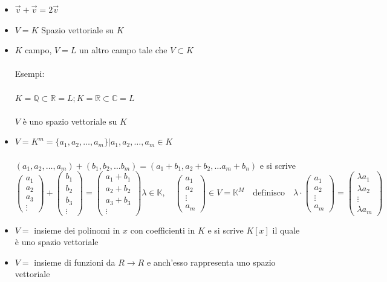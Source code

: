 \documentclass{report}
\begin{document}
\begin{itemize}
    \item{$\Vec{v} + \Vec{v} = 2\Vec{v}$}
    \item{$V = K$ Spazio vettoriale su $K$}
    \item{$K$ campo, $V = L$ un altro campo tale che $V \subset K$ \\ \\
    Esempi: \\ \\
    $K = \mathbb{Q} \subset \mathbb{R} = L ; K = \mathbb{R} \subset \mathbb{C} = L$
    \\ \\
    $V$ è uno spazio vettoriale su $K$}
    \item{$V = K^m = \{a_1, a_2, \dots, a_m\} | a_1, a_2, \dots, a_m \in K$ \\ \\
    $(a_1, a_2, \dots, a_m) + (b_1, b_2, \dots b_m) = (a_1 + b_1, a_2 + b_2, \dots a_m + b_n)$ e si scrive $\begin{pmatrix}
a_1 \\
a_2 \\
a_3 \\
\vdots
\end{pmatrix}
+
\begin{pmatrix}
b_1 \\
b_2 \\
b_3 \\
\vdots
\end{pmatrix}
=
\begin{pmatrix}
a_1 + b_1 \\
a_2 + b_2 \\
a_3 + b_3 \\
\vdots
\end{pmatrix}

\lambda \in \mathbb{K}, \quad
\begin{pmatrix}
a_1 \\
a_2 \\
\vdots \\
a_m
\end{pmatrix}
\in V = \mathbb{K}^M \quad \text{definisco} \quad \lambda \cdot
\begin{pmatrix}
a_1 \\
a_2 \\
\vdots \\
a_m
\end{pmatrix}
=
\begin{pmatrix}
\lambda a_1 \\
\lambda a_2 \\
\vdots \\
\lambda a_m
\end{pmatrix}
$}
\item{
$V = $ insieme dei polinomi in $x$ con coefficienti in $K$ e si scrive $K[x]$ il quale è uno spazio vettoriale
}
\item{$V =$ insieme di funzioni da $R \rightarrow R$ e anch'esso rappresenta uno spazio vettoriale}
\end{itemize}
\end{document}

